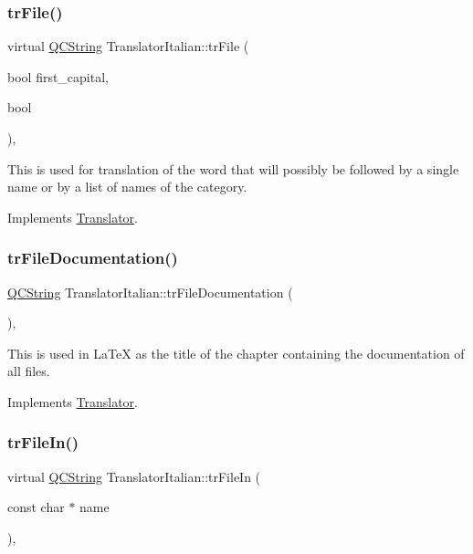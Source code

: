 \subsubsection{\texorpdfstring{trFile()}{trFile()}}
{\footnotesize\ttfamily virtual \mbox{\hyperlink{class_q_c_string}{Q\+C\+String}} Translator\+Italian\+::tr\+File (\begin{DoxyParamCaption}\item[{bool}]{first\+\_\+capital,  }\item[{bool}]{ }\end{DoxyParamCaption})\hspace{0.3cm}{\ttfamily [inline]}, {\ttfamily [virtual]}}

This is used for translation of the word that will possibly be followed by a single name or by a list of names of the category. 

Implements \mbox{\hyperlink{class_translator}{Translator}}.

\mbox{\label{class_translator_italian_a4fca960d64e17c1ac879eba39ceca2eb}} 
\subsubsection{\texorpdfstring{trFileDocumentation()}{trFileDocumentation()}}
{\footnotesize\ttfamily \mbox{\hyperlink{class_q_c_string}{Q\+C\+String}} Translator\+Italian\+::tr\+File\+Documentation (\begin{DoxyParamCaption}{ }\end{DoxyParamCaption})\hspace{0.3cm}{\ttfamily [inline]}, {\ttfamily [virtual]}}

This is used in La\+TeX as the title of the chapter containing the documentation of all files. 

Implements \mbox{\hyperlink{class_translator}{Translator}}.

\mbox{\label{class_translator_italian_abf9ddba80a74df4604cd2e533fa4386c}} 
\subsubsection{\texorpdfstring{trFileIn()}{trFileIn()}}
{\footnotesize\ttfamily virtual \mbox{\hyperlink{class_q_c_string}{Q\+C\+String}} Translator\+Italian\+::tr\+File\+In (\begin{DoxyParamCaption}\item[{const char $\ast$}]{name }\end{DoxyParamCaption})\hspace{0.3cm}{\ttfamily [inline]}, {\ttfamily [virtual]}}

